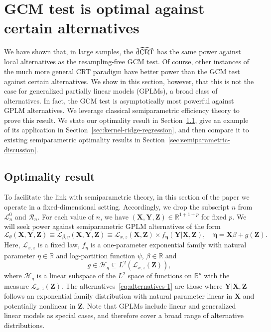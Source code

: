 \documentclass[aos]{imsart}
\theoremstyle{plain}
\theoremstyle{remark}
\newcommand{\R}{\mathbb{R}}								%
\newcommand{\prx}{\bm X}								%
\newcommand{\prz}{\bm Z}								%
\newcommand{\pry}{{\bm Y}}								%
\newcommand{\law}{\mathcal L}							%
\newcommand{\nulllaws}{\mathscr L^0}					%
\newcommand{\regclass}{\mathscr R}					    %
\newcommand{\dCRThat}{\widehat{\textnormal{dCRT}}}		%
\renewcommand{\H}{\mathcal H}		 					%
\begin{document}
\section{GCM test is optimal against certain alternatives} \label{sec:optimality}

We have shown that, in large samples, the $\dCRThat$ has the same power against local alternatives as the resampling-free GCM test. Of course, other instances of the much more general CRT paradigm have better power than the GCM test against certain alternatives. We show in this section, however, that this is not the case for generalized partially linear models (GPLMs), a broad class of alternatives. In fact, the GCM test is asymptotically most powerful against GPLM alternatives. We leverage classical semiparametric efficiency theory \citep{Choi1996, VDV1998, Kosorok2008} to prove this result. We state our optimality result in Section~\ref{sec:optimality-result}, give an example of its application in Section~\ref{sec:kernel-ridge-regression}, and then compare it to existing semiparametric optimality results in Section~\ref{sec:semiparametric-discussion}.

\subsection{Optimality result} \label{sec:optimality-result}

To facilitate the link with semiparametric theory, in this section of the paper we operate in a fixed-dimensional setting. Accordingly, we drop the subscript $n$ from $\nulllaws_n$ and $\regclass_n$. For each value of $n$, we have $(\prx, \pry, \prz) \in \R^{1 + 1 + p}$ for fixed $p$. We will seek power against semiparametric GPLM alternatives of the form
\begin{equation}
    \law_{\theta}(\prx, \pry, \prz) \equiv \law_{\beta, \eta}(\prx, \pry, \prz) \equiv \law_{x,z}(\prx, \prz) \times f_{\bm \eta}(\pry|\prx, \prz),\quad \bm \eta = \prx \beta + g(\prz).
    \label{eq:alternatives-1}
\end{equation}
Here, $\law_{x,z}$ is a fixed law, $f_\eta$ is a one-parameter exponential family with natural parameter $\eta \in \R$ and log-partition function $\psi$, $\beta \in \R$ and 
\begin{equation}
    g \in \H_g \subseteq L^2(\law_{x,z}(\bm Z)), 
\end{equation}
where $\H_g$ is a linear subspace of the $L^2$ space of functions on $\R^p$ with the measure $\law_{x,z}(\bm Z)$. The alternatives~\eqref{eq:alternatives-1} are those where $\pry|\prx,\prz$ follows an exponential family distribution with natural parameter linear in $\prx$ and potentially nonlinear in $\prz$. Note that GPLMs include linear and generalized linear models as special cases, and therefore cover a broad range of alternative distributions.
\end{document}

